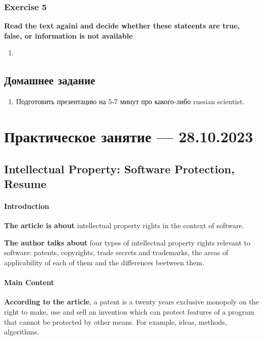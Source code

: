 \documentclass{article}
\begin{document}
\subsubsection{Exercise 5}

\textbf{Read the text againi and decide whether these stateents are true, false, or information is not available}

\begin{enumerate}
    \item 
\end{enumerate}

\subsection{Домашнее задание}

\begin{enumerate}
    \item Подготовить презентацию на 5-7 минут про какого-либо russian scientist.
\end{enumerate}

\section{Практическое занятие — 28.10.2023}

\subsection{Intellectual Property: Software Protection, Resume}

\paragraph{Introduction}

\textbf{The article is about} intellectual property rights in the context of software.

\textbf{The author talks about} four types of intellectual property rights relevant to software: patents, copyrights, trade secrets and trademarks, the areas of applicability of each of them and the differences beetween them.

\paragraph{Main Content}

\textbf{According to the article}, a patent is a twenty years exclusive monopoly on the right to make, use and sell an invention which can protect features of a program that cannot be protected by other means. For example, ideas, methods, algorithms.
\end{document}
